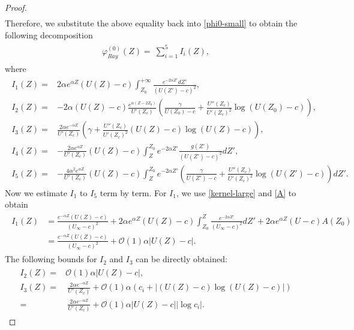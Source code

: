\documentclass[reqno,11pt]{amsart}
\numberwithin{equation}{section}
\numberwithin{equation}{section}
\theoremstyle{plain}
\begin{document}
\begin{proof}
\begin{align*}
	\end{align*}
	Therefore, we substitute the above equality back into \eqref{phi0-small} to obtain the following decomposition
	\begin{align}\label{phi0-small-decom}\begin{aligned}
			\varphi_{Ray}^{(0)}(Z)=~\sum_{i=1}^{5}I_i(Z),
	\end{aligned}\end{align}
 where
	\begin{align}\begin{aligned}
			I_1(Z)=&2\alpha e^{\alpha Z}(U(Z)-c)\int_{Z_0}^{+\infty}\frac{e^{-2\alpha Z'}dZ'}{(U(Z')-c)^2},\\
			I_{2}(Z) =& -2\alpha(U(Z)-c)\frac{e^{\alpha(Z-2 Z_0)}}{U'(Z_c)}\left(\frac{\gamma}{U(Z_0)-c}+\frac{U''(Z_c)}{U'(Z_c)^2}\log(U(Z_0)-c)\right), \\
			I_{3}(Z) =& \frac{2\alpha e^{-\alpha Z}}{U'(Z_c)}\left(\gamma+\frac{U''(Z_c)}{U'(Z_c)^2}(U(Z)-c)\log(U(Z)-c)\right), \\
			I_{4}(Z) =&   -\frac{2\alpha e^{\alpha Z}}{U'(Z_c)}(U(Z)-c)\int_{Z}^{Z_0}e^{-2\alpha Z'}\frac{g(Z')}{(U(Z')-c)^2}dZ',\\
			I_{5}(Z) =&   -\frac{4\alpha^2 e^{\alpha Z}}{U'(Z_c)}(U(Z)-c)\int_{Z}^{Z_0}e^{-2\alpha Z'}\left(\frac{\gamma}{U(Z')-c}+\frac{ U''(Z_c)}{U'(Z_c)^2}\log(U(Z')-c)\right)dZ'.\nonumber
	\end{aligned}\end{align}
Now we estimate $I_1$ to $I_5$ term by term. For $I_1$, we use \eqref{kernel-large} and \eqref{A} to obtain
	\begin{align}\label{I1}\begin{aligned}
			I_1(Z)&= 
			\frac{e^{-\alpha Z}(U(Z)-c)}{ (U_\infty-c)^2}+2\alpha e^{\alpha Z}(U(Z)-c)\int_{Z_0}^Z \frac{e^{-2\alpha Z'}}{(U_{\infty}-c)^2} dZ'+2\alpha e^{\alpha Z}(U-c)A(Z_0)\\
			&=\frac{e^{-\alpha Z}(U(Z)-c)}{ (U_\infty-c)^2}+\mathcal{O}(1)\alpha|U(Z)-c|.
	\end{aligned}\end{align}
The following bounds for $I_2$ and $I_3$ can be directly obtained:
	\begin{align}\label{I2-3}\begin{aligned}
			I_{2} (Z)=& \mathcal{O}(1)\alpha |U(Z)-c|, \\
			I_{3}(Z)= &~ \frac{2\alpha e^{-\alpha Z}}{U'(Z_c)}+\mathcal{O}(1)\alpha\left(c_i+\big|(U(Z)-c)\log(U(Z)-c)\big|\right)\\
			=&~\frac{2\alpha e^{-\alpha Z}}{U'(Z_c)}+\mathcal{O}(1)\alpha|U(Z)-c||\log c_i|.

\end{aligned}
\end{align}
\end{proof}
\end{document}
